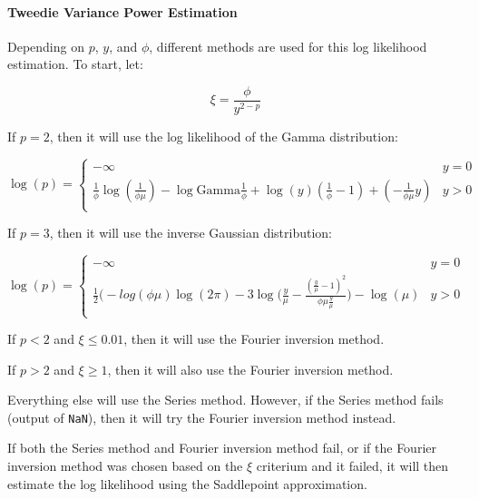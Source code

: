 \waterExampleInPython


\paragraph{Tweedie Variance Power Estimation} 
\label{par:tweevar}

Depending on $p$, $y$, and $\phi$, different methods are used for this log likelihood estimation. To start, let:

$$\xi = \frac{\phi}{y^{2-p}}$$

If $p=2$, then it will use the log likelihood of the Gamma distribution:

$$\log (p) = \begin{cases} - \infty & y=0 \\ \frac{1}{\phi} \log (\frac{1}{\phi \mu}) - \log \text{Gamma} \frac{1}{\phi} + \log (y)(\frac{1}{\phi} -1) + (-\frac{1}{\phi \mu} y) & y>0 \\\end{cases}$$

If $p=3$, then it will use the inverse Gaussian distribution:

$$\log (p) = \begin{cases} - \infty & y=0 \\ \frac{1}{2} \Big(-log (\phi \mu) \log (2 \pi) -3 \log \big( \frac{y}{\mu} - \frac{(\frac{y}{\mu} -1)^2}{\phi \mu \frac{y}{\mu}} \Big) - \log (\mu) & y>0 \\\end{cases}$$

If $p<2$ and $\xi \leq 0.01$, then it will use the Fourier inversion method.

If $p>2$ and $\xi \geq 1$, then it will also use the Fourier inversion method.

Everything else will use the Series method. However, if the Series method fails (output of \texttt{NaN}), then it will try the Fourier inversion method instead.

If both the Series method and Fourier inversion method fail, or if the Fourier inversion method was chosen based on the $\xi$ criterium and it failed, it will then estimate the log likelihood using the Saddlepoint approximation.

